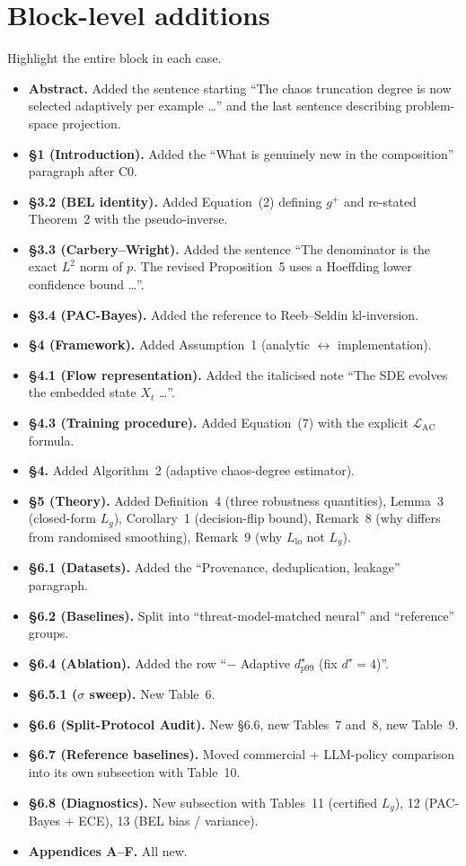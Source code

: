 \documentclass[11pt,letterpaper]{article}
\begin{document}
\section{Block-level additions}
Highlight the entire block in each case.
\begin{itemize}[leftmargin=1.4em]
  \item \textbf{Abstract.} Added the sentence starting ``The chaos truncation degree is now selected adaptively per example \ldots'' and the last sentence describing problem-space projection.
  \item \textbf{\S1 (Introduction).} Added the ``What is genuinely new in the composition'' paragraph after C0.
  \item \textbf{\S3.2 (BEL identity).} Added Equation~(2) defining $g^{+}$ and re-stated Theorem~2 with the pseudo-inverse.
  \item \textbf{\S3.3 (Carbery--Wright).} Added the sentence ``The denominator is the exact $L^2$ norm of $p$. The revised Proposition~5 uses a Hoeffding lower confidence bound \ldots''.
  \item \textbf{\S3.4 (PAC-Bayes).} Added the reference to Reeb--Seldin kl-inversion.
  \item \textbf{\S4 (Framework).} Added Assumption~1 (analytic $\leftrightarrow$ implementation).
  \item \textbf{\S4.1 (Flow representation).} Added the italicised note ``The SDE evolves the embedded state $X_t$ \ldots''.
  \item \textbf{\S4.3 (Training procedure).} Added Equation~(7) with the explicit $\mathcal L_{\mathrm{AC}}$ formula.
  \item \textbf{\S4.} Added Algorithm~2 (adaptive chaos-degree estimator).
  \item \textbf{\S5 (Theory).} Added Definition~4 (three robustness quantities), Lemma~3 (closed-form $L_g$), Corollary~1 (decision-flip bound), Remark~8 (why differs from randomised smoothing), Remark~9 (why $L_{\mathrm{lo}}$ not $L_g$).
  \item \textbf{\S6.1 (Datasets).} Added the ``Provenance, deduplication, leakage'' paragraph.
  \item \textbf{\S6.2 (Baselines).} Split into ``threat-model-matched neural'' and ``reference'' groups.
  \item \textbf{\S6.4 (Ablation).} Added the row ``$-$ Adaptive $d^\star_{p99}$ (fix $d^\star=4$)''.
  \item \textbf{\S6.5.1 ($\sigma$ sweep).} New Table~6.
  \item \textbf{\S6.6 (Split-Protocol Audit).} New \S6.6, new Tables~7 and~8, new Table~9.
  \item \textbf{\S6.7 (Reference baselines).} Moved commercial + LLM-policy comparison into its own subsection with Table~10.
  \item \textbf{\S6.8 (Diagnostics).} New subsection with Tables~11 (certified $L_g$), 12 (PAC-Bayes + ECE), 13 (BEL bias / variance).
  \item \textbf{Appendices A--F.} All new.
\end{itemize}
\end{document}

